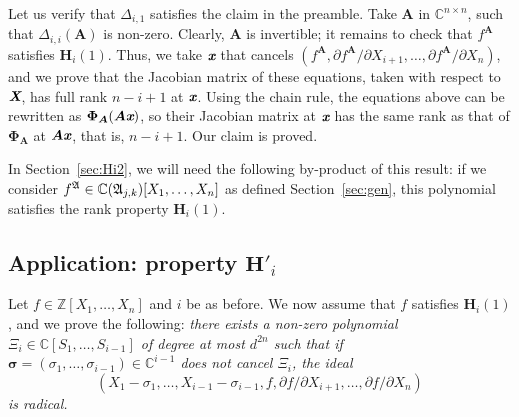 \documentclass[sigconf]{acmart}
\def\Xb{\textit{\textbf{X}}}
\def\mA{{\bm A}}
\def\xb{\textit{\textbf{x}}}
\def\C{\mathbb{C}}
\def\pa{\partial}
\newcommand{\ZZ}{{\mathbb{Z}}}
\def\A{\frak{A}}
\begin{document}
Let us verify that $\Delta_{i,1}$ satisfies the claim in the preamble.
Take $\mA$ in $\C^{n\times n}$, such that $\Delta_{i,i}(\mA)$ is
non-zero. Clearly, $\mA$ is invertible; it remains to check that
$f^\mA$ satisfies $\textbf{H}_i(1)$. Thus, we take $\xb$ that cancels
$(f^\mA, {\pa f^\mA}/{\pa X_{i+1}},\dots,{\pa f^\mA}/{\pa X_n})$, and
we prove that the Jacobian matrix of these equations, taken with
respect to $\Xb$, has full rank $n-i+1$ at $\xb$. Using the chain
rule, the equations above can be rewritten as $\bm\Phi_\mA(\mA \xb)$,
so their Jacobian matrix at $\xb$ has the same rank as that of
$\bm\Phi_\mA$ at $\mA \xb$, that is, $n-i+1$. Our claim is proved.

In Section~\ref{sec:Hi2}, we will need the following by-product of
this result: if we consider $f^\A \in \C(\frak
A_{j,k})[X_1,\dots,X_n]$ as defined Section~\ref{sec:gen}, this
polynomial satisfies the rank property $\textbf{H}_i(1)$.


\subsection{Application: property $\textbf{H}'_i$}\label{ssec:fiber}

Let $f \in \ZZ[X_1,\hdots,X_n]$ and $i$ be as before. We now assume
that $f$ satisfies $\textbf{H}_i(1)$, and we prove the following: {\em
  there exists a non-zero polynomial $\Xi_{i} \in
  \C[S_1,\dots,S_{i-1}]$ of degree at most $d^{2n}$ such that if $\bm
  \sigma =(\sigma_1,\dots,\sigma_{i-1})\in \C^{i-1}$ does not cancel
  $\Xi_{i}$, the ideal
  $$(X_1-\sigma_1,\dots,X_{i-1}-\sigma_{i-1},f, {\pa f}/{\pa
    X_{i+1}},\dots,{\pa f}/{\pa X_n})$$ is radical.}

\smallskip
\end{document}
